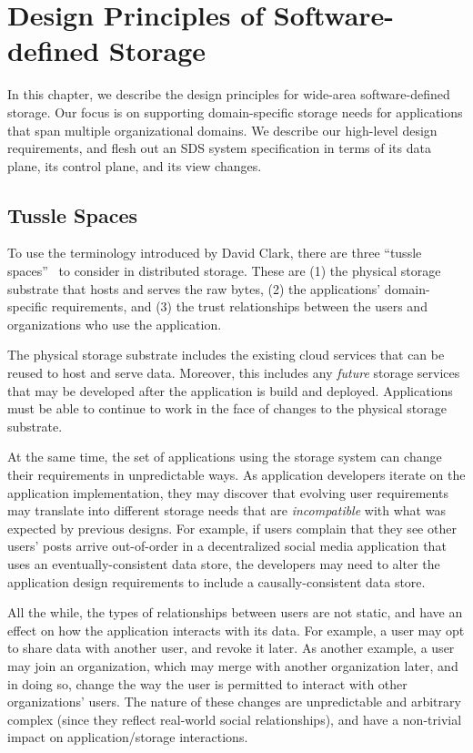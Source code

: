 \chapter{Design Principles of Software-defined Storage}
\label{chap:design_principles}

In this chapter, we describe the design principles for wide-area
software-defined storage.  Our focus is on supporting domain-specific storage
needs for applications that span multiple
organizational domains.  We describe our high-level design requirements,
and flesh out an SDS system specification in terms of its data plane, its
control plane, and its view changes.

\section{Tussle Spaces}

To use the terminology introduced by David Clark, there are three ``tussle
spaces''~\cite{david-clark-tussle-spaces} to consider in distributed storage.
These are (1) the physical storage substrate that hosts and serves the raw
bytes, (2) the applications' domain-specific requirements, and (3) the trust
relationships between the users and organizations who use the application.

The physical storage substrate includes the existing cloud services that can be
reused to host and serve data.  Moreover, this includes any \emph{future}
storage services that may be developed after the application is build and
deployed.  Applications must be able to continue to work in the face of changes
to the physical storage substrate.

At the same time, the set of applications using the storage system can change
their requirements in unpredictable ways.  As application developers iterate on
the application implementation, they may discover that evolving user
requirements may translate into different storage needs that are
\emph{incompatible} with what was expected by previous designs.  For example, if
users complain that they see other users' posts arrive out-of-order in a
decentralized social media application that uses an eventually-consistent data
store, the developers may need to alter the application design requirements to
include a causally-consistent data store.

All the while, the types of relationships between users are not static, and have
an effect on how the application interacts with its data.  For example, a user may opt
to share data with another user, and revoke it later.  As another example, a user may join an
organization, which may merge with another organization later, and in doing so, change the
way the user is permitted to interact with other organizations' users.  The nature of these
changes are unpredictable and arbitrary complex (since they reflect real-world
social relationships), and have a non-trivial impact on application/storage
interactions.

